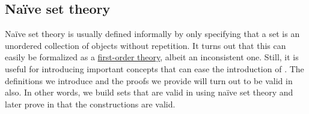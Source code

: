 \subsection{Na\"ive set theory}\label{subsec:naive_set_theory}

Na\"ive set theory is usually defined informally by only specifying that a set is an unordered collection of objects without repetition. It turns out that this can easily be formalized as a \hyperref[def:first_order_theory]{first-order theory}, albeit an inconsistent one. Still, it is useful for introducing important concepts that can ease the introduction of \hyperref[def:zfc]{}. The definitions we introduce and the proofs we provide will turn out to be valid in  also. In other words, we build sets that are valid in  using na\"ive set theory and later prove in  that the constructions are valid.

